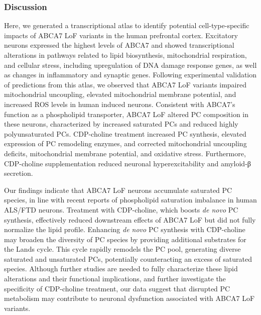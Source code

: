 \subsubsection{Discussion}
Here, we generated a transcriptional atlas to identify potential cell-type-specific impacts of ABCA7 LoF variants in the human prefrontal cortex. Excitatory neurons expressed the highest levels of ABCA7 and showed transcriptional alterations in pathways related to lipid biosynthesis, mitochondrial respiration, and cellular stress, including upregulation of DNA damage response genes, as well as changes in inflammatory and synaptic genes. Following experimental validation of predictions from this atlas, we observed that ABCA7 LoF variants impaired mitochondrial uncoupling, elevated mitochondrial membrane potential, and increased ROS levels in human induced neurons. Consistent with ABCA7's function as a phospholipid transporter, ABCA7 LoF altered PC composition in these neurons, characterized by increased saturated PCs and reduced highly polyunsaturated PCs. CDP-choline treatment increased PC synthesis, elevated expression of PC remodeling enzymes, and corrected mitochondrial uncoupling deficits, mitochondrial membrane potential, and oxidative stress. Furthermore, CDP-choline supplementation reduced neuronal hyperexcitability and amyloid-β secretion. 

Our findings indicate that ABCA7 LoF neurons accumulate saturated PC species, in line with recent reports of phospholipid saturation imbalance in human ALS/FTD neurons\supercite{Giblin2025-ri}. Treatment with CDP-choline, which boosts \textit{de novo} PC synthesis, effectively reduced downstream effects of ABCA7 LoF but did not fully normalize the lipid profile. Enhancing \textit{de novo} PC synthesis with CDP-choline may broaden the diversity of PC species by providing additional substrates for the Lands cycle. This cycle rapidly remodels the PC pool, generating diverse saturated and unsaturated PCs\supercite{Yaghmour2025-mo,ODonnell2022-ev}, potentially counteracting an excess of saturated species. Although further studies are needed to fully characterize these lipid alterations and their functional implications, and further investigate the specificity of CDP-choline treatment, our data suggest that disrupted PC metabolism may contribute to neuronal dysfunction associated with ABCA7 LoF variants.

